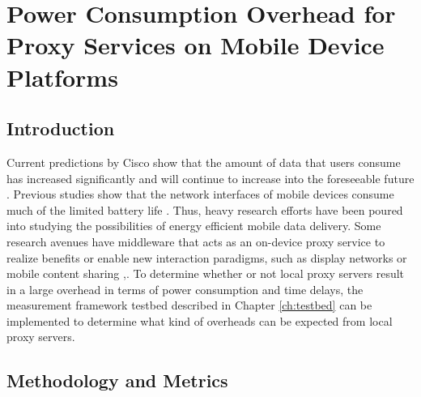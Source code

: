 \chapter{Power Consumption Overhead for Proxy Services on Mobile Device Platforms}
\section*{Introduction}
Current predictions by Cisco show that the amount of data that users consume has increased significantly and will continue to increase into the foreseeable future \cite{VNI14}. Previous studies show that the network interfaces of mobile devices consume much of the limited battery life \cite{Carroll:2010:APC:1855840.1855861}. Thus, heavy research efforts have been poured into studying the possibilities of energy efficient mobile data delivery. Some research avenues have middleware that acts as an on-device proxy service to realize benefits or enable new interaction paradigms, such as display networks \cite{6174992} or mobile content sharing \cite{Seeling:2014:OES:2671189.2671194},\cite{6692468}. To determine whether or not local proxy servers result in a large overhead in terms of power consumption and time delays, the measurement framework testbed described in Chapter \ref{ch:testbed} can be implemented to determine what kind of overheads can be expected from local proxy servers.

\section*{Methodology and Metrics}

